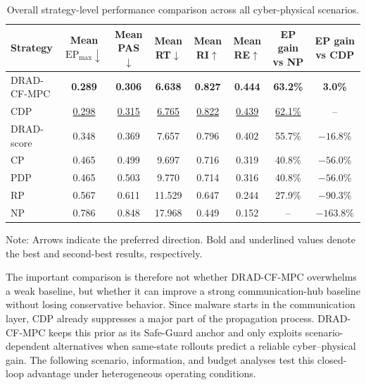 \documentclass[lettersize,journal]{IEEEtran}
\newcommand{\best}[1]{\textbf{#1}}
\newcommand{\second}[1]{\underline{#1}}
\begin{document}
\begin{table}[!t]
\centering
\small
\begin{threeparttable}
\caption{Overall strategy-level performance comparison across all cyber-physical scenarios.}
\label{tab:main_performance_summary}
\begin{tabular}{lccccccc}
\toprule
\rowcolor{TableHeader}
Strategy 
& Mean $\mathrm{EP}_{\max}\downarrow$ 
& Mean PAS$\downarrow$ 
& Mean RT$\downarrow$ 
& Mean RI$\uparrow$ 
& Mean RE$\uparrow$
& EP gain vs NP
& EP gain vs CDP \\
\midrule
\rowcolor{RowProposed}
DRAD-CF-MPC 
& \best{0.289} 
& \best{0.306} 
& \best{6.638} 
& \best{0.827} 
& \best{0.444} 
& \best{63.2\%} 
& \best{3.0\%} \\
\rowcolor{RowBaseline}
CDP         
& \second{0.298} 
& \second{0.315} 
& \second{6.765} 
& \second{0.822} 
& \second{0.439} 
& \second{62.1\%} 
& -- \\
\rowcolor{RowRisk}
DRAD-score        
& 0.348 
& 0.369 
& 7.657 
& 0.796 
& 0.402 
& 55.7\% 
& $-16.8\%$ \\
\rowcolor{RowPhysical}
CP          
& 0.465 
& 0.499 
& 9.697 
& 0.716 
& 0.319 
& 40.8\% 
& $-56.0\%$ \\
\rowcolor{RowPhysical}
PDP         
& 0.465 
& 0.503 
& 9.770 
& 0.714 
& 0.316 
& 40.8\% 
& $-56.0\%$ \\
\rowcolor{RowNeutral}
RP          
& 0.567 
& 0.611 
& 11.529 
& 0.647 
& 0.244 
& 27.9\% 
& $-90.3\%$ \\
\rowcolor{RowWeak}
NP          
& 0.786 
& 0.848 
& 17.968 
& 0.449 
& 0.152 
& -- 
& $-163.8\%$ \\
\bottomrule
\end{tabular}
\begin{tablenotes}
\footnotesize
\item Note: Arrows indicate the preferred direction. Bold and underlined values denote the best and second-best results, respectively.
\end{tablenotes}
\end{threeparttable}
\end{table}

The important comparison is therefore not whether DRAD-CF-MPC overwhelms a weak baseline, but whether it can improve a strong communication-hub baseline without losing conservative behavior. Since malware starts in the communication layer, CDP already suppresses a major part of the propagation process. DRAD-CF-MPC keeps this prior as its Safe-Guard anchor and only exploits scenario-dependent alternatives when same-state rollouts predict a reliable cyber--physical gain. The following scenario, information, and budget analyses test this closed-loop advantage under heterogeneous operating conditions.
\end{document}
